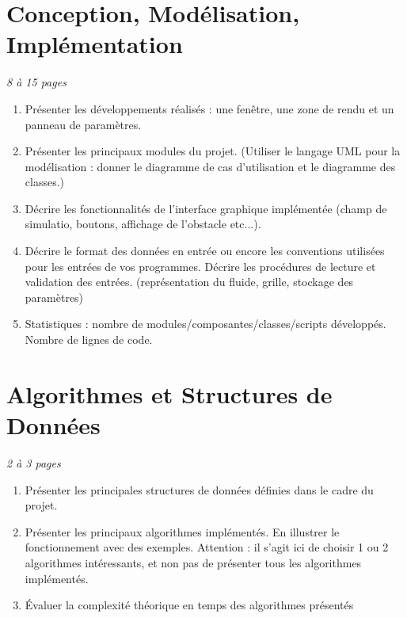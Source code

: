 \documentclass[a4paper]{article}
\begin{document}
\section{Conception, Modélisation, Implémentation} 
\emph{8 à 15 pages}

\begin{enumerate}%
\item Présenter les développements réalisés : une fenêtre, une zone de rendu et un panneau de paramètres.
\item Présenter les principaux modules du projet. (Utiliser le langage UML pour la modélisation : donner le diagramme de cas d'utilisation et le diagramme des classes.)
\item Décrire les fonctionnalités de l'interface graphique implémentée (champ de simulatio, boutons, affichage de l'obstacle etc...).
    
\item Décrire le format des données en entrée ou encore les conventions utilisées pour les entrées de vos programmes. Décrire les procédures de lecture et validation des entrées. (représentation du fluide, grille, stockage des paramètres)
\item Statistiques : nombre de modules/composantes/classes/scripts développés. Nombre de lignes de code.
\end{enumerate}

\section{Algorithmes et Structures de Données}
\emph{2 à 3 pages}
\begin{enumerate}%
\item 	Présenter les principales structures de données définies dans le cadre du projet.
\item 	Présenter les principaux algorithmes implémentés. En illustrer le fonctionnement avec des exemples. Attention : il s'agit ici de choisir 1 ou 2 algorithmes intéressants, et non pas de présenter tous les algorithmes implémentés.
\item 	Évaluer la complexité théorique en temps des algorithmes présentés
\end{enumerate}
\end{document}
